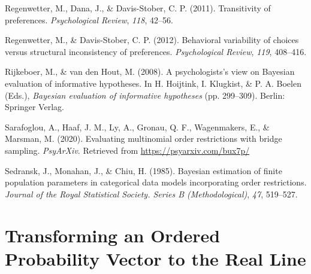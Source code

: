 \documentclass[
  english,
  man,floatsintext]{apa6}
\begin{document}
\leavevmode\hypertarget{ref-regenwetter2011transitivity}{}%
Regenwetter, M., Dana, J., \& Davis-Stober, C. P. (2011). Transitivity of preferences. \emph{Psychological Review}, \emph{118}, 42--56.

\leavevmode\hypertarget{ref-regenwetter2012behavioral}{}%
Regenwetter, M., \& Davis-Stober, C. P. (2012). Behavioral variability of choices versus structural inconsistency of preferences. \emph{Psychological Review}, \emph{119}, 408--416.

\leavevmode\hypertarget{ref-rijkeboer2008psychologists}{}%
Rijkeboer, M., \& van den Hout, M. (2008). A psychologists's view on Bayesian evaluation of informative hypotheses. In H. Hoijtink, I. Klugkist, \& P. A. Boelen (Eds.), \emph{Bayesian evaluation of informative hypotheses} (pp. 299--309). Berlin: Springer Verlag.

\leavevmode\hypertarget{ref-sarafoglou2020evaluatingPreprint}{}%
Sarafoglou, A., Haaf, J. M., Ly, A., Gronau, Q. F., Wagenmakers, E., \& Marsman, M. (2020). Evaluating multinomial order restrictions with bridge sampling. \emph{PsyArXiv}. Retrieved from \url{https://psyarxiv.com/bux7p/}

\leavevmode\hypertarget{ref-sedransk1985bayesian}{}%
Sedransk, J., Monahan, J., \& Chiu, H. (1985). Bayesian estimation of finite population parameters in categorical data models incorporating order restrictions. \emph{Journal of the Royal Statistical Society. Series B (Methodological)}, \emph{47}, 519--527.

\endgroup

\clearpage

\setcounter{table}{0}
\setcounter{figure}{0}
\setcounter{equation}{0}
\setcounter{section}{0}
\renewcommand\thefigure{0\arabic{figure}}
\renewcommand{\thetable}{0\arabic{table}}
\renewcommand{\theequation}{C\arabic{equation}}
\renewcommand{\thesection}{\Alph{section}}

\hypertarget{transforming-an-ordered-probability-vector-to-the-real-line}{%
\section{Transforming an Ordered Probability Vector to the Real Line}\label{transforming-an-ordered-probability-vector-to-the-real-line}}
\end{document}
